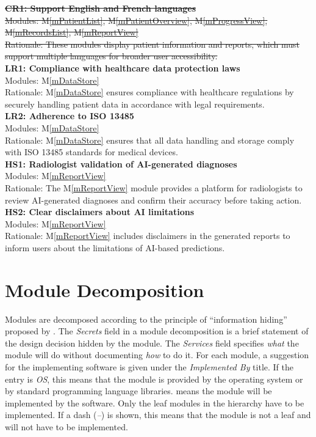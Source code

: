 \documentclass[12pt, titlepage]{article}
\newcommand{\mref}[1]{M\ref{#1}}
\begin{document}
\noindent\sout{\textbf{CR1: Support English and French languages}} \\
\sout{Modules: \mref{mPatientList}, \mref{mPatientOverview}, \mref{mProgressView}, \mref{mRecordsList}, \mref{mReportView}} \\
\sout{Rationale: These modules display patient information and reports, which must support multiple languages for broader user accessibility.} \\

\noindent\textbf{LR1: Compliance with healthcare data protection laws} \\
Modules: \mref{mDataStore} \\
Rationale: \mref{mDataStore} ensures compliance with healthcare regulations by securely handling patient data in accordance with legal requirements. \\
\newline
\textbf{LR2: Adherence to ISO 13485} \\
Modules: \mref{mDataStore} \\
Rationale: \mref{mDataStore} ensures that all data handling and storage comply with ISO 13485 standards for medical devices.\\

\noindent\textbf{HS1: Radiologist validation of AI-generated diagnoses} \\
Modules: \mref{mReportView} \\
Rationale: The \mref{mReportView} module provides a platform for radiologists to review AI-generated diagnoses and confirm their accuracy before taking action. \\
\newline
\textbf{HS2: Clear disclaimers about AI limitations} \\
Modules: \mref{mReportView} \\
Rationale: \mref{mReportView} includes disclaimers in the generated reports to inform users about the limitations of AI-based predictions. \\

\section{Module Decomposition} \label{SecMD}

Modules are decomposed according to the principle of ``information hiding''
proposed by \citet{ParnasEtAl1984}. The \emph{Secrets} field in a module
decomposition is a brief statement of the design decision hidden by the
module. The \emph{Services} field specifies \emph{what} the module will do
without documenting \emph{how} to do it. For each module, a suggestion for the
implementing software is given under the \emph{Implemented By} title. If the
entry is \emph{OS}, this means that the module is provided by the operating
system or by standard programming language libraries.  \emph{\progname{}} means the
module will be implemented by the \progname{} software.
\newline
Only the leaf modules in the hierarchy have to be implemented. If a dash
(\emph{--}) is shown, this means that the module is not a leaf and will not have
to be implemented.
\end{document}
